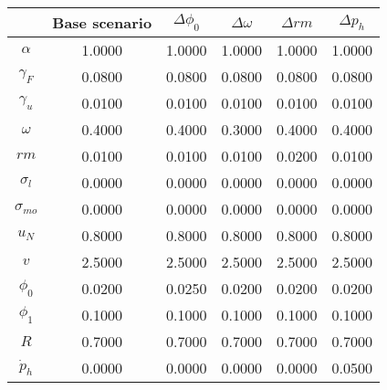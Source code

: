 \begin{tabular}{cccccc}
\toprule
{} &  Base scenario &  $\Delta \phi_0$ &  $\Delta \omega$ &  $\Delta rm$ &  $\Delta p_h$ \\
\midrule
\textbf{$\alpha$     } &         1.0000 &           1.0000 &           1.0000 &       1.0000 &        1.0000 \\
\textbf{$\gamma_F$   } &         0.0800 &           0.0800 &           0.0800 &       0.0800 &        0.0800 \\
\textbf{$\gamma_u$   } &         0.0100 &           0.0100 &           0.0100 &       0.0100 &        0.0100 \\
\textbf{$\omega$     } &         0.4000 &           0.4000 &           0.3000 &       0.4000 &        0.4000 \\
\textbf{$rm$         } &         0.0100 &           0.0100 &           0.0100 &       0.0200 &        0.0100 \\
\textbf{$\sigma_{l}$ } &         0.0000 &           0.0000 &           0.0000 &       0.0000 &        0.0000 \\
\textbf{$\sigma_{mo}$} &         0.0000 &           0.0000 &           0.0000 &       0.0000 &        0.0000 \\
\textbf{$u_N$        } &         0.8000 &           0.8000 &           0.8000 &       0.8000 &        0.8000 \\
\textbf{$v$          } &         2.5000 &           2.5000 &           2.5000 &       2.5000 &        2.5000 \\
\textbf{$\phi_0$     } &         0.0200 &           0.0250 &           0.0200 &       0.0200 &        0.0200 \\
\textbf{$\phi_1$     } &         0.1000 &           0.1000 &           0.1000 &       0.1000 &        0.1000 \\
\textbf{$R$          } &         0.7000 &           0.7000 &           0.7000 &       0.7000 &        0.7000 \\
\textbf{$\dot p_h$   } &         0.0000 &           0.0000 &           0.0000 &       0.0000 &        0.0500 \\
\bottomrule
\end{tabular}
